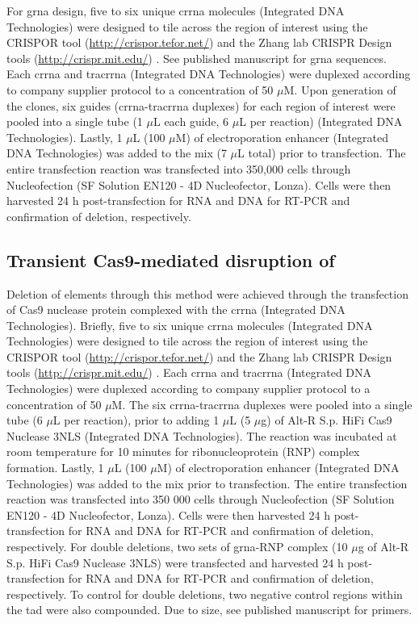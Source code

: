 For \gls{grna} design, five to six unique \gls{crrna} molecules (Integrated DNA Technologies) were designed to tile across the region of interest using the CRISPOR tool (\url{http://crispor.tefor.net/}) \cite{haeusslerEvaluationOfftargetOntarget2016} and the Zhang lab CRISPR Design tools (\url{http://crispr.mit.edu/}) \cite{hsuDNATargetingSpecificity2013}.
See published manuscript for \gls{grna} sequences.
Each \gls{crrna} and \gls{tracrrna} (Integrated DNA Technologies) were duplexed according to company supplier protocol to a concentration of 50 $\mu$M.
Upon generation of the clones, six guides (\gls{crrna}-\gls{tracrrna} duplexes) for each region of interest were pooled into a single tube (1 $\mu$L each guide, 6 $\mu$L per reaction) (Integrated DNA Technologies).
Lastly, 1 $\mu$L (100 $\mu$M) of electroporation enhancer (Integrated DNA Technologies) was added to the mix (7 $\mu$L total) prior to transfection.
The entire transfection reaction was transfected into 350,000 cells through Nucleofection (SF Solution EN120 - 4D Nucleofector, Lonza).
Cells were then harvested 24 h post-transfection for RNA and DNA for RT-PCR and confirmation of deletion, respectively.

\subsection{Transient Cas9-mediated disruption of }

Deletion of elements through this method were achieved through the transfection of Cas9 nuclease protein complexed with the \gls{crrna} (Integrated DNA Technologies).
Briefly, five to six unique \gls{crrna} molecules (Integrated DNA Technologies) were designed to tile across the region of interest using the CRISPOR tool (\url{http://crispor.tefor.net/}) \cite{haeusslerEvaluationOfftargetOntarget2016} and the Zhang lab CRISPR Design tools (\url{http://crispr.mit.edu/}) \cite{hsuDNATargetingSpecificity2013}.
Each \gls{crrna} and \gls{tracrrna} (Integrated DNA Technologies) were duplexed according to company supplier protocol to a concentration of 50 $\mu$M.
The six \gls{crrna}-\gls{tracrrna} duplexes were pooled into a single tube (6 $\mu$L per reaction), prior to adding 1 $\mu$L (5 $\mu$g) of Alt-R S.p. HiFi Cas9 Nuclease 3NLS (Integrated DNA Technologies).
The reaction was incubated at room temperature for 10 minutes for ribonucleoprotein (RNP) complex formation.
Lastly, 1 $\mu$L (100 $\mu$M) of electroporation enhancer (Integrated DNA Technologies) was added to the mix prior to transfection.
The entire transfection reaction was transfected into 350 000 cells through Nucleofection (SF Solution EN120 - 4D Nucleofector, Lonza).
Cells were then harvested 24 h post-transfection for RNA and DNA for RT-PCR and confirmation of deletion, respectively.
For double deletions, two sets of \gls{grna}-RNP complex (10 $\mu$g of Alt-R S.p. HiFi Cas9 Nuclease 3NLS) were transfected and harvested 24 h post-transfection for RNA and DNA for RT-PCR and confirmation of deletion, respectively.
To control for double deletions, two negative control regions within the \gls{tad} were also compounded.
Due to size, see published manuscript for primers.

